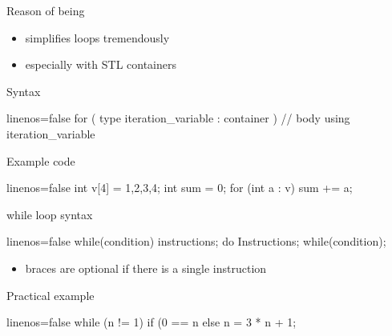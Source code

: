 \begin{frame}[fragile]
  \begin{block}{Reason of being}
    \begin{itemize}
    \item simplifies loops tremendously
    \item especially with STL containers
    \end{itemize}
  \end{block}
  \begin{block}{Syntax}
    \begin{cppcode*}{linenos=false}
      for ( type iteration_variable : container ) {
        // body using iteration_variable
      }
    \end{cppcode*}
  \end{block}
  \begin{exampleblock}{Example code}
    \begin{cppcode*}{linenos=false}
      int v[4] = {1,2,3,4};
      int sum = 0;
      for (int a : v) { sum += a; }
    \end{cppcode*}
  \end{exampleblock}
\end{frame}

\begin{frame}[fragile]
  \begin{block}{while loop syntax}
    \begin{cppcode*}{linenos=false}
      while(condition) {
        instructions;
      }
      do {
        Instructions;
      } while(condition);
    \end{cppcode*}
    \vspace{-0.3cm}
    \begin{itemize}
      \item braces are optional if there is a single instruction
    \end{itemize}
  \end{block}
  \pause
  \begin{exampleblock}{Practical example}
    \begin{cppcode*}{linenos=false}
      while (n != 1)
        if (0 == n%
        else n = 3 * n + 1;
    \end{cppcode*}
  \end{exampleblock}
\end{frame}

